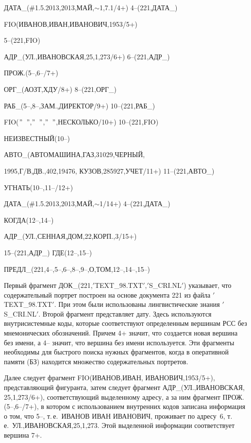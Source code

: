 \begin{multicols}{2}
{\noindent
 ДАТА\_(\#1.5.2013,2013,МАЙ,$\sim$1,7.1/4+) 4--(221,ДАТА\_)

\noindent
 FIO(ИВАНОВ,ИВАН,ИВАНОВИЧ,1953/5+)

  5--(221,FIO)

\noindent
 АДР\_(УЛ.,ИВАНОВСКАЯ,25,1,273/6+) 6--(221,АДР\_)

 \noindent
 ПРОЖ.(5--,6--/7+)

 \noindent
 ОРГ\_(АОЗТ,ХДУ/8+) 8--(221,ОРГ\_)

 \noindent
 РАБ\_(5--,8--,ЗАМ.,ДИРЕКТОР/9+) 10--(221,РАБ\_)

 \noindent
 FIO($"$\ $"$,$"$\ $"$,$"$\ $"$,НЕСКОЛЬКО/10+) 10--(221,FIO)

 \noindent
 НЕИЗВЕСТНЫЙ(10--)

 \noindent
 АВТО\_(АВТОМАШИНА,ГАЗ,31029,ЧЕРНЫЙ,

 1995,Г/В,ДВ.,402,19476,
КУЗОВ,285927,УЧЕТ/11+) 11--(221,АВТО\_)

 \noindent
 УГНАТЬ(10--,11--/12+)

 \noindent
 ДАТА\_(\#1.5.2013,2013,МАЙ,$\sim$1/14+) 4--(221,ДАТА\_)

 \noindent
 КОГДА(12--,14--)

 \noindent
 АДР\_(УЛ.,СЕННАЯ,ДОМ,22,КОРП.,3/15+)

  15--(221,АДР\_) ГДЕ(12--,15--)

 \noindent
 ПРЕДЛ\_(221,4--,5--,6--,8--,9--,О,ТОМ,12--,14--,15--)

 }

 \medskip

 Первый фрагмент ДОК\_(221,$'$TEXT\_98.TXT$'$,\linebreak $'$S\_CRI.NL$'$)
 указывает, что
содержательный портрет построен на основе документа 221 из файла
$'$TEXT\_98.TXT$'$. При этом были использованы лингвистические знания
$'$S\_CRI.NL$'$. Второй фрагмент представляет дату. Здесь используются
внут\-ри\-сис\-тем\-ные коды, которые соответствуют определенным вершинам РСС
без мнемонических обозначений. Причем 4+ значит, что создается новая
вершина без имени, а 4-- значит, что вершина без имени используется. Эти
фрагменты необходимы для быстрого поиска нужных фрагментов, когда в
оперативной памяти (БЗ) находится множество содержательных портретов.

 Далее следует фрагмент FIO(ИВАНОВ,ИВАН, ИВАНОВИЧ,1953/5+),
представляющий фигуранта, затем следует фрагмент
АДР\_(УЛ.,\linebreak ИВАНОВСКАЯ, 25,1,273/6+), соответствующий выделенному
адресу, а за ним фрагмент ПРОЖ.\linebreak(5--,6--/7+), в котором с использованием
внутренних кодов записана информация о том, что 5--, т.\,е.\ ИВАНОВ ИВАН
ИВАНОВИЧ, проживает по адресу~6, т.\,е.\ УЛ.,ИВАНОВСКАЯ,25,1,273.
Этой выделенной информации соответствует вершина 7+.


\end{multicols}
